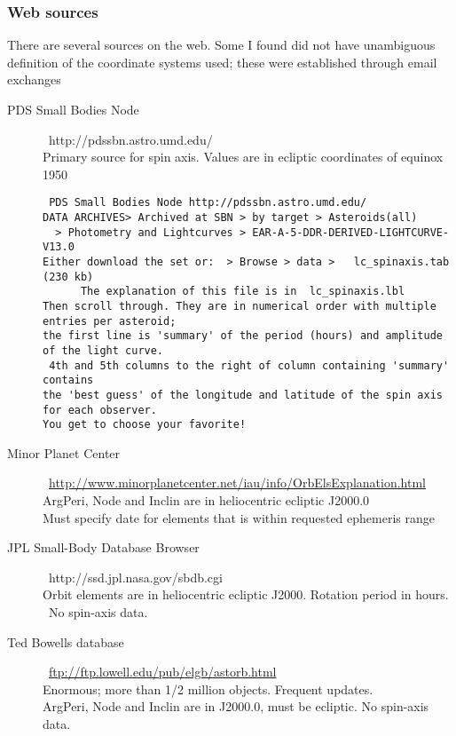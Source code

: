 \documentclass{article}
\newcommand{\qi}{\\ \hspace*{2.em}}      %
\begin{document}
\subsubsection{Web sources} %

There are several sources on the web. Some I found did not have unambiguous definition of the coordinate systems used; these were established through email exchanges
\begin{description}  %

\item [PDS Small Bodies Node] \  http://pdssbn.astro.umd.edu/
\\ Primary source for spin axis.  Values are in ecliptic coordinates of equinox 1950
\vspace{-3.mm} 
\begin{verbatim}
 PDS Small Bodies Node http://pdssbn.astro.umd.edu/ 
DATA ARCHIVES> Archived at SBN > by target > Asteroids(all) 
  > Photometry and Lightcurves > EAR-A-5-DDR-DERIVED-LIGHTCURVE-V13.0 
Either download the set or:  > Browse > data >   lc_spinaxis.tab (230 kb)
      The explanation of this file is in  lc_spinaxis.lbl
Then scroll through. They are in numerical order with multiple entries per asteroid; 
the first line is 'summary' of the period (hours) and amplitude of the light curve.
 4th and 5th columns to the right of column containing 'summary' contains 
the 'best guess' of the longitude and latitude of the spin axis for each observer.
You get to choose your favorite! 
\end{verbatim}


\item [Minor Planet Center]  \  \url{http://www.minorplanetcenter.net/iau/info/OrbElsExplanation.html} 
\\ ArgPeri, Node and Inclin are in heliocentric ecliptic J2000.0
\qi Must specify date for elements that is within requested ephemeris range

\item [JPL Small-Body Database Browser]  \ http://ssd.jpl.nasa.gov/sbdb.cgi
\\ Orbit elements are in heliocentric ecliptic J2000.  Rotation period in hours. \ No spin-axis data.

\item [Ted Bowells database]   \ \url{ftp://ftp.lowell.edu/pub/elgb/astorb.html}
\\ Enormous; more than 1/2 million objects. Frequent updates. 
\\ ArgPeri, Node and Inclin are in J2000.0,  must be ecliptic. No spin-axis data.

\end{description}
\end{document}
